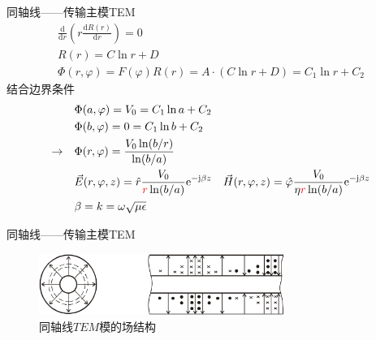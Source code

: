 \begin{frame}{同轴线——传输主模TEM}
    \begin{gather*}
        \frac{\mathrm{d}}{\mathrm{d}r}\left(r\frac{\mathrm{d}R(r)}{\mathrm{d}r}\right)=0 \\
        R(r)=C\ln r+D                                                                    \\
        \Phi(r,\varphi)=F(\varphi)R(r)=A\cdot(C\ln r+D)=C_1\ln r+C_2
    \end{gather*}
    结合边界条件
    \begin{align*}
        &\Phi(a,\varphi)=V_0=C_1\ln a+C_2\\
        &\Phi(b,\varphi)=0=C_1\ln b+C_2\\
        \rightarrow\quad &\Phi(r,\varphi)=\frac{V_0\ln(b/r)}{\ln (b/a)}\\
        &\vec{E}(r,\varphi,z)=\hat{r}\frac{V_0}{{\color{red}{r}}\ln(b/a)}\mathrm{e}^{-\mathrm{j}\beta z}\quad \vec{H}(r,\varphi,z)=\hat{\varphi}\frac{V_0}{\eta {\color{red}{r}}\ln(b/a)}\mathrm{e}^{-\mathrm{j}\beta z}\\
        &\beta=k=\omega\sqrt{\mu\epsilon}
    \end{align*}
\end{frame}

\begin{frame}{同轴线——传输主模TEM}
    \begin{figure}
        \includegraphics[width=8cm]{Cha6//fig6-31.png}
        \caption{同轴线$TEM$模的场结构}
    \end{figure}
\end{frame}

